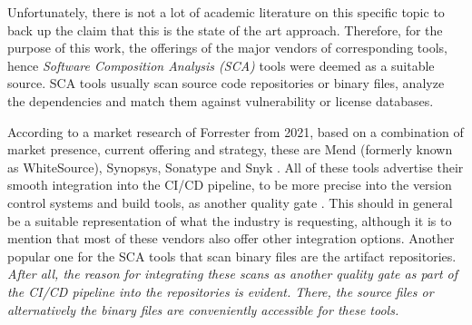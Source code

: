 Unfortunately, there is not a lot of academic literature on this specific topic to back up the claim that this is the state of the art approach. Therefore, for the purpose of this work, the offerings of the major vendors of corresponding tools, hence \emph{Software Composition Analysis (SCA)} tools were deemed as a suitable source. SCA tools usually scan source code repositories or binary files, analyze the dependencies and match them against vulnerability or license databases.\par
According to a market research of Forrester from 2021, based on a combination of market presence, current offering and strategy, these are Mend (formerly known as WhiteSource), Synopsys, Sonatype and Snyk \cite{ForresterSCA}. All of these tools advertise their smooth integration into the CI/CD pipeline, to be more precise into the version control systems and build tools, as another quality gate \cite{MendIntegration, BDBAIntegration, SonatypeIntegration, SnykIntegration}. This should in general be a suitable representation of what the industry is requesting, although it is to mention that most of these vendors also offer other integration options. Another popular one for the SCA tools that scan binary files are the artifact repositories.\\

\emph{After all, the reason for integrating these scans as another quality gate as part of the CI/CD pipeline into the repositories is evident.  There, the source files or alternatively the binary files are conveniently accessible for these tools.}


 
